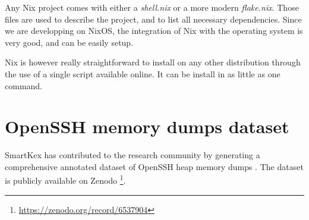     Any Nix project comes with either a \textit{shell.nix} or a more modern \textit{flake.nix}. Those files are used to describe the project, and to list all necessary dependencies. Since we are developping on NixOS, the integration of Nix with the operating system is very good, and can be easily setup.
    
    Nix is however really straightforward to install on any other distribution through the use of a single script available online. It can be install in as little as one command.






\section{OpenSSH memory dumps dataset}\label{sec:background:kex:dataset}

    SmartKex has contributed to the research community by generating a comprehensive annotated dataset of OpenSSH heap memory dumps \cite{SmartKex22}. The dataset is publicly available on Zenodo \footnote{\url{https://zenodo.org/record/6537904}}. 

